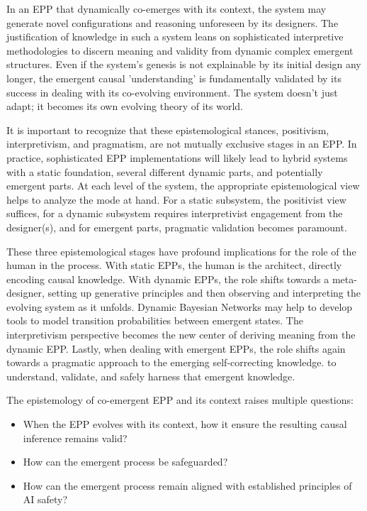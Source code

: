 In an EPP that dynamically co-emerges with its context, the system may generate novel configurations and reasoning unforeseen by its designers. The justification of knowledge in such a system leans on sophisticated interpretive methodologies to discern meaning and validity from dynamic complex emergent structures. Even if the system’s genesis is not explainable by its initial design any longer, the emergent causal 'understanding' is fundamentally validated by its success in dealing with its co-evolving environment. The system doesn't just adapt; it becomes its own evolving theory of its world.

It is important to recognize that these epistemological stances, positivism, interpretivism, and pragmatism, are not mutually exclusive stages in an EPP. In practice, sophisticated EPP implementations will likely lead to hybrid systems with a static foundation, several different dynamic parts, and potentially emergent parts. At each level of the system, the appropriate epistemological view helps to analyze the mode at hand. For a static subsystem, the positivist view suffices, for a dynamic subsystem requires interpretivist engagement from the designer(s), and for emergent parts, pragmatic validation becomes paramount.

These three epistemological stages have profound implications for the role of the human in the process. With static EPPs, the human is the architect, directly encoding causal knowledge. With dynamic EPPs, the role shifts towards a meta-designer, setting up generative principles and then observing and interpreting the evolving system as it unfolds. Dynamic Bayesian Networks\cite{dagum1992dynamic} may help to develop tools to model transition probabilities between emergent states. The interpretivism perspective becomes the new center of deriving meaning from the dynamic EPP. Lastly, when dealing with emergent EPPs, the role shifts again towards a pragmatic approach to the emerging self-correcting knowledge. to understand, validate, and safely harness that emergent knowledge.

The epistemology of co-emergent EPP and its context raises multiple questions:

\begin{itemize}
    \item When the EPP evolves with its context, how it ensure the resulting causal inference remains valid?
    \item How can the emergent process be safeguarded?
    \item How can the emergent process remain aligned with established principles of AI safety?
\end{itemize}

